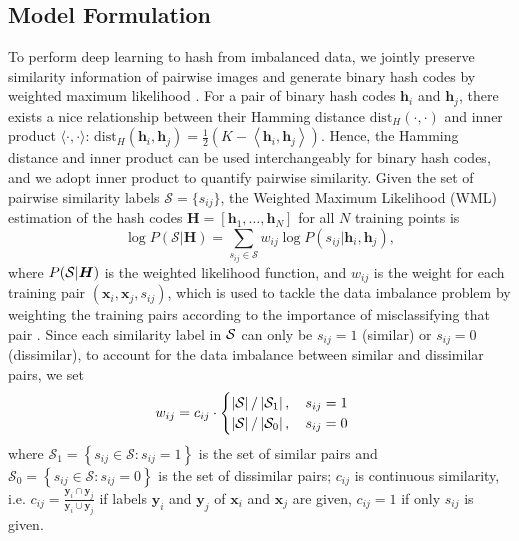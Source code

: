 \documentclass[10pt,twocolumn,letterpaper]{article}
\begin{document}
\subsection{Model Formulation}
To perform deep learning to hash from imbalanced data, we jointly preserve similarity information of pairwise images and generate binary hash codes by weighted maximum likelihood \cite{cite:JMLR10MWL}. For a pair of binary hash codes ${\bm h}_i$ and ${\bm h}_j$, there exists a nice relationship between their Hamming distance $\mathrm{dist}_H(\cdot,\cdot)$ and inner product $\langle \cdot,\cdot \rangle$: ${\textrm{dis}}{{\text{t}}_H}\left( {{{\bm{h}}_i},{{\bm{h}}_j}} \right) = \frac{1}{2}\left( {K - \left\langle {{{\bm{h}}_i},{{\bm{h}}_j}} \right\rangle } \right)$. Hence, the Hamming distance and inner product can be used interchangeably for binary hash codes, and we adopt inner product to quantify pairwise similarity. Given the set of pairwise similarity labels $\mathcal{S} = \{s_{ij}\}$, the Weighted Maximum Likelihood (WML) estimation of the hash codes ${\bm H} = [{\bm h}_1,\ldots,{\bm h}_N]$ for all $N$ training points is
\begin{equation}\label{eqn:WML}
	\log P\left( {\mathcal{S}|{\bm{H}}} \right) = \sum\limits_{{s_{ij}} \in \mathcal{S}} {{w_{ij}}\log P\left( {{s_{ij}}|{{\bm{h}}_i},{{\bm{h}}_j}} \right)} ,
\end{equation}
where $P({\cal S}|{\bm H})$ is the weighted likelihood function, and $w_{ij}$ is the weight for each training pair $({\bm x}_i, {\bm x}_j, s_{ij})$, which is used to tackle the data imbalance problem by weighting the training pairs according to the importance of misclassifying that pair \cite{cite:JMLR10MWL}. Since each similarity label in ${\cal S}$ can only be $s_{ij} = 1$ (similar) or $s_{ij} = 0$ (dissimilar), to account for the data imbalance between similar and dissimilar pairs, we set 
\begin{equation}\label{eqn:Weight}
{w_{ij}} = c_{ij} \cdot
  \begin{cases}
    \left| {{\mathcal{S}}} \right|/\left| {{\mathcal{S}_1}} \right|,\quad {s_{ij}} = 1 \hfill \\
    \left| {{\mathcal{S}}} \right|/\left| {{\mathcal{S}_0}} \right|,\quad {s_{ij}} = 0 \hfill \\ 
  \end{cases}
\end{equation}
where ${\mathcal{S}_1} = \left\{ {{s_{ij}} \in \mathcal{S}:{s_{ij}} = 1} \right\}$ is the set of similar pairs and ${\mathcal{S}_0} = \left\{ {{s_{ij}} \in \mathcal{S}:{s_{ij}} = 0} \right\}$ is the set of dissimilar pairs; $c_{ij}$ is continuous similarity, i.e. $c_{ij} = \frac{{{\bm{y}_i} \cap {\bm{y}_j}}}{{{\bm{y}_i} \cup {\bm{y}_j}}}$ if labels $\bm{y}_i$ and $\bm{y}_j$ of $\bm{x}_i$ and $\bm{x}_j$ are given, $c_{ij}=1$ if only $s_{ij}$ is given.
\end{document}
